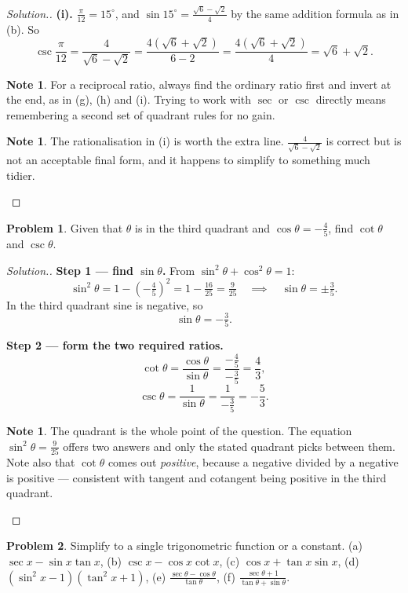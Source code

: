 \documentclass[11pt,a4paper]{article}
\theoremstyle{definition}
\newtheorem{note}[thm]{Note}
\newtheorem{problemx}{Problem}[section]
\newenvironment{problem}{\begin{problemx}}{\end{problemx}}
\newenvironment{solution}
  {\renewcommand{\qedsymbol}{}\begin{proof}[\textit{Solution}.]}
  {\end{proof}}
\begin{document}
\begin{solution}
\textbf{(i).} $\frac{\pi}{12}=15^\circ$, and $\sin 15^\circ=\frac{\sqrt{6}-\sqrt{2}}{4}$
by the same addition formula as in (b). So
$$\csc\frac{\pi}{12}=\frac{4}{\sqrt{6}-\sqrt{2}}
=\frac{4\left(\sqrt{6}+\sqrt{2}\right)}{6-2}
=\frac{4\left(\sqrt{6}+\sqrt{2}\right)}{4}=\sqrt{6}+\sqrt{2}.$$

\begin{note}
For a reciprocal ratio, always find the ordinary ratio first and invert at the end, as
in (g), (h) and (i). Trying to work with $\sec$ or $\csc$ directly means remembering a
second set of quadrant rules for no gain.
\end{note}

\begin{note}
The rationalisation in (i) is worth the extra line. $\frac{4}{\sqrt{6}-\sqrt{2}}$ is
correct but is not an acceptable final form, and it happens to simplify to something
much tidier.
\end{note}
\end{solution}

\begin{problem}
Given that $\theta$ is in the third quadrant and $\cos\theta=-\frac{4}{5}$, find
$\cot\theta$ and $\csc\theta$.
\end{problem}

\begin{solution}
\textbf{Step 1 --- find $\sin\theta$.} From $\sin^2\theta+\cos^2\theta=1$:
$$\sin^2\theta=1-\left(-\tfrac{4}{5}\right)^2=1-\tfrac{16}{25}=\tfrac{9}{25}
\quad\implies\quad \sin\theta=\pm\tfrac{3}{5}.$$
In the third quadrant sine is negative, so
$$\sin\theta=-\tfrac{3}{5}.$$

\textbf{Step 2 --- form the two required ratios.}
$$\cot\theta=\frac{\cos\theta}{\sin\theta}=\frac{-\frac{4}{5}}{-\frac{3}{5}}
=\frac{4}{3},$$
$$\csc\theta=\frac{1}{\sin\theta}=\frac{1}{-\frac{3}{5}}=-\frac{5}{3}.$$

\begin{note}
The quadrant is the whole point of the question. The equation
$\sin^2\theta=\frac{9}{25}$ offers two answers and only the stated quadrant picks
between them. Note also that $\cot\theta$ comes out \emph{positive}, because a negative
divided by a negative is positive --- consistent with tangent and cotangent being
positive in the third quadrant.
\end{note}
\end{solution}

\begin{problem}
Simplify to a single trigonometric function or a constant.
\quad (a) $\sec x-\sin x\tan x$, \quad (b) $\csc x-\cos x\cot x$, \quad
(c) $\cos x+\tan x\sin x$, \quad (d) $\left(\sin^2x-1\right)\left(\tan^2x+1\right)$,
\quad (e) $\frac{\sec\theta-\cos\theta}{\tan\theta}$, \quad
(f) $\frac{\sec\theta+1}{\tan\theta+\sin\theta}$.
\end{problem}
\end{document}
